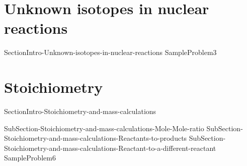 \documentclass[main.tex]{subfiles}
\newcommand\chapterlabel{ChMIX-biomoleculesinsolution}\setcounter{figurenewcounter}{0}\setcounter{tablenewcounter}{0}\setcounter{formulanewcounter}{0}
\begin{document}
\renewcommand\chapterlabel{Ch-nuclear}
\section{\faFlash Unknown isotopes in nuclear reactions}
{SectionIntro-Unknown-isotopes-in-nuclear-reactions}
  {SampleProblem3}




\renewcommand\chapterlabel{Ch-mole}
\section{\faFire Stoichiometry }
{SectionIntro-Stoichiometry-and-mass-calculations}
\sloppy \begin{description}
{SubSection-Stoichiometry-and-mass-calculations-Mole-Mole-ratio}
{SubSection-Stoichiometry-and-mass-calculations-Reactants-to-products}
{SubSection-Stoichiometry-and-mass-calculations-Reactant-to-a-different-reactant}
{SampleProblem6}
\end{description}















 
\end{document}
